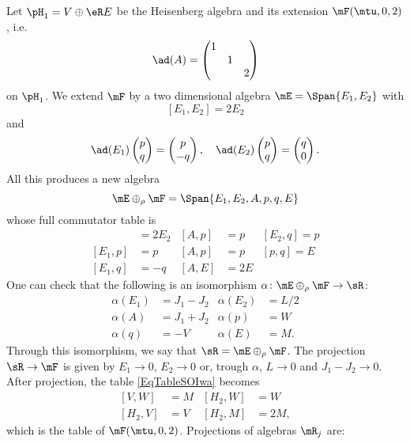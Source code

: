 Let $\pH_{1}=V\oplus\eR E$ be the Heisenberg algebra and its extension $\mF(\mtu,0,2)$, i.e.
\[
	\ad(A)=\begin{pmatrix}
		1 \\&1\\&&2
	\end{pmatrix}
\]
on $\pH_{1}$. We extend $\mF$ by a two dimensional algebra $\mE=\Span\{ E_{1},E_{2} \}$ with
\[
	[E_{1},E_{2}]=2E_{2}
\]
and
\begin{equation}
	\ad(E_{1})\begin{pmatrix}
		p \\q
	\end{pmatrix}=\begin{pmatrix}
		p \\-q
	\end{pmatrix},
	\quad
	\ad(E_{2})\begin{pmatrix}
		p \\q
	\end{pmatrix}
	=\begin{pmatrix}
		q \\0
	\end{pmatrix}.
\end{equation}
All this produces a new algebra
\[
	\mE\oplus_{\rho}\mF=\Span\{ E_{1},E_{2},A,p,q,E \}
\]
whose full commutator table is
\begin{align*}
	[E_{1},E_{2}] & =2E_{2} & [A,p] & =p  & [E_{2},q]=p \\
	[E_{1},p]     & =p      & [A,p] & =p  & [p,q]=E     \\
	[E_{1},q]     & =-q     & [A,E] & =2E
\end{align*}
One can check that the following is an isomorphism $\alpha\colon \mE\oplus_{\rho}\mF\to \sR$:
\begin{subequations}\label{EqDefalphaisomRF}
	\begin{align}
		\alpha(E_{1}) & =J_{1}-J_{2} & \alpha(E_{2}) & =L/2 \\
		\alpha(A)     & =J_{1}+J_{2} & \alpha(p)     & =W   \\
		\alpha(q)     & =-V          & \alpha(E)     & =M.
	\end{align}
\end{subequations}
Through this isomorphism, we say that $\sR=\mE\oplus_{\rho}\mF$. The projection $\sR\to\mF$ is given by $E_{1}\to 0$, $E_{2}\to 0$ or, trough $\alpha$, $L\to 0$ and $J_{1}-J_{2}\to 0$. After projection, the table \eqref{EqTableSOIwa} becomes
\begin{subequations}
	\begin{align}
		[V,W]     & =M
		          & [H_{2},W] & =W   \\
		[H_{2},V] & =V
		          & [H_{2},M] & =2M,
	\end{align}
\end{subequations}
which is the table of $\mF(\mtu,0,2)$. Projections of algebras $\mR_{j}$ are:

